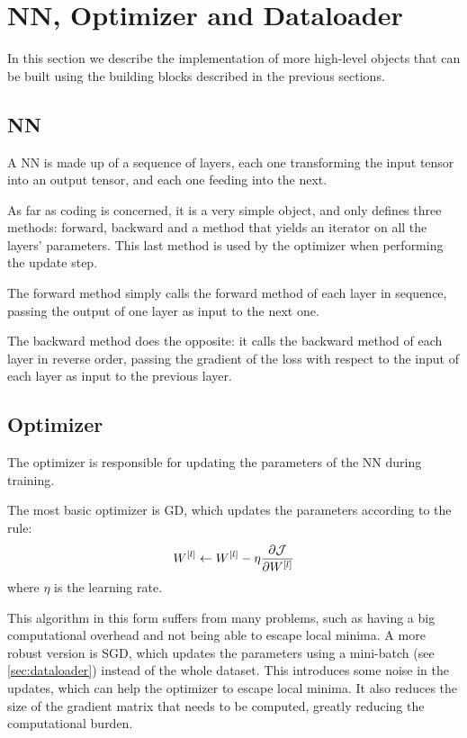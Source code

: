 \section{\acl*{NN}, Optimizer and Dataloader}
In this section we describe the implementation of more high-level objects that can be built using the building blocks described in the previous sections.

\subsection{\acl*{NN}}
A \acl{NN} is made up of a sequence of layers, each one transforming the input tensor into an output tensor, and each one feeding into the next.

As far as coding is concerned, it is a very simple object, and only defines three methods: forward, backward and a method that yields an iterator on all the layers' parameters. This last method is used by the optimizer when performing the update step.

The forward method simply calls the forward method of each layer in sequence, passing the output of one layer as input to the next one.

The backward method does the opposite: it calls the backward method of each layer in reverse order, passing the gradient of the loss with respect to the input of each layer as input to the previous layer.

\subsection{Optimizer}
The optimizer is responsible for updating the parameters of the \acl{NN} during training.

The most basic optimizer is \ac{GD}, which updates the parameters according to the rule:
\begin{equation}
    W^{[l]} \gets W^{[l]} - \eta \pdv{\mathcal{J}}{W^{[l]}}
\end{equation}
where $\eta$ is the learning rate.

This algorithm in this form suffers from many problems, such as having a big computational overhead and not being able to escape local minima. A more robust version is \ac{SGD}, which updates the parameters using a mini-batch (see \cref{sec:dataloader}) instead of the whole dataset. This introduces some noise in the updates, which can help the optimizer to escape local minima. It also reduces the size of the gradient matrix that needs to be computed, greatly reducing the computational burden.

